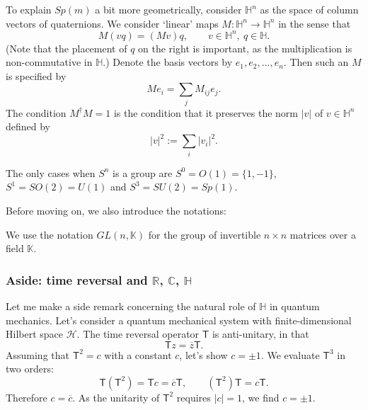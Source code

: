 \documentclass[12pt]{article}
\numberwithin{equation}{section}
\numberwithin{figure}{section}
\theoremstyle{remark}
\def\bC{\mathbb{C}}
\def\bH{\mathbb{H}}
\def\bK{\mathbb{K}}
\def\bR{\mathbb{R}}
\def\cH{\mathcal{H}}
\def\sT{\mathsf{T}}
\begin{document}
To explain $Sp(m)$ a bit more geometrically, consider $\bH^n$
as the space of column vectors of quaternions. 
We consider `linear' maps  $M:\bH^n\to \bH^n$ in the sense that
\begin{equation}
M (vq) = (Mv) q, \qquad v\in \bH^n,\ q\in \bH.
\end{equation} 
(Note that the placement of $q$ on the right is important, 
as the multiplication is non-commutative in $\bH$.)
Denote the basis vectors by $e_1,e_2,\ldots,e_n$.
Then such an $M$ is specified by \begin{equation}
M e_i = \sum_j M_{ij} e_j.
\end{equation}
The condition $M^\dagger M=1$ is the condition that it preserves the norm $|v|$ of $v\in \bH^n$
defined by \begin{equation}
  |v|^2 := \sum_i |v_i|^2.
\end{equation}

\begin{fact}
  The only cases when $S^n$ is a group are $S^0=O(1)=\{1,-1\}$, $S^1=SO(2)=U(1)$
  and $S^3=SU(2)=Sp(1)$.
\end{fact}

Before moving on,
we also introduce the notations:
\begin{definition}
We use the notation $GL(n,\bK)$ for the group of invertible $n\times n$ matrices over a field $\bK$.
\end{definition}

\subsubsection{Aside: time reversal and $\bR$, $\bC$, $\bH$}

Let me make a side remark concerning the natural role of $\bH$ in quantum mechanics.
Let's consider a quantum mechanical system with finite-dimensional Hilbert space $\cH$.
The time reversal operator $\sT$ is anti-unitary, in that 
\begin{equation}
  \sT z = \overline z \sT.
\end{equation}
Assuming that $\sT^2=c$ with a constant $c$, let's show $c=\pm1$. We evaluate $\sT^3$ in two orders:
\begin{equation}
\sT(\sT^2)= \sT c = \overline{c}\sT,\qquad
(\sT^2)\sT = c\sT.
\end{equation} Therefore $c=\overline{c}$. As the unitarity of $\sT^2$ requires $|c|=1$,
 we find $c=\pm 1$.
\end{document}
